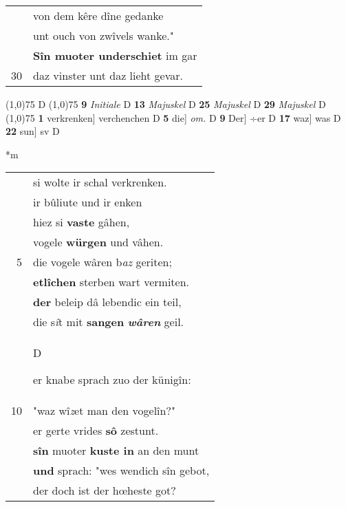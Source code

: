 \documentclass[8pt,a4paper,notitlepage]{article}
\begin{document}
\begin{table}[ht]
\begin{minipage}[t]{0.5\linewidth}
\begin{tabular}{rl}
 & von dem kêre dîne gedanke\\ 
 & unt ouch von zwîvels wanke."\\ 
 & \textbf{Sîn muoter underschiet} im gar\\ 
30 & daz vinster unt daz lieht gevar.\\ 
\end{tabular}
\scriptsize
\line(1,0){75} \newline
D \newline
\line(1,0){75} \newline
\textbf{9} \textit{Initiale} D  \textbf{13} \textit{Majuskel} D  \textbf{25} \textit{Majuskel} D  \textbf{29} \textit{Majuskel} D  \newline
\line(1,0){75} \newline
\textbf{1} verkrenken] verchenchen D \textbf{5} die] \textit{om.} D \textbf{9} Der] ÷er D \textbf{17} waz] was D \textbf{22} sun] sv D \newline
\end{minipage}
\hspace{0.5cm}
\begin{minipage}[t]{0.5\linewidth}
\small
\begin{center}*m
\end{center}
\begin{tabular}{rl}
 & si wolte ir schal verkrenken.\\ 
 & ir bûliute und ir enken\\ 
 & hiez si \textbf{vaste} gâhen,\\ 
 & vogele \textbf{würgen} und vâhen.\\ 
5 & die vogele wâren b\textit{az} geriten;\\ 
 & \textbf{etlîchen} sterben wart vermiten.\\ 
 & \textbf{der} beleip dâ lebendic ein teil,\\ 
 & die s\textit{î}t mit \textbf{sangen} \textit{\textbf{wâren}} geil.\\ 
 & \begin{large}D\end{large}er knabe sprach zuo der künigîn:\\ 
10 & "waz wî\textit{z}et man den vogelîn?"\\ 
 & er gerte vrides \textbf{sô} zestunt.\\ 
 & \textbf{sîn} muoter \textbf{kuste in} an den munt\\ 
 & \textbf{und} sprach: "wes wendich sîn gebot,\\ 
 & der doch ist der hœheste got?\\ 

\end{tabular}
\end{minipage}
\end{table}
\end{document}
